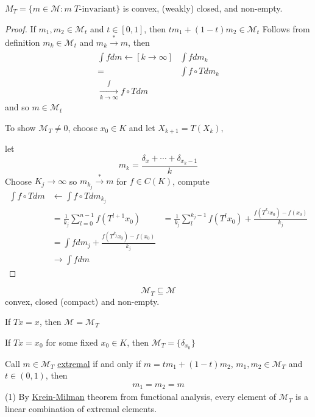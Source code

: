 \begin{theorem}
	$M_{T} = \{ m \in \mathcal{M} : m\; T \text{-invariant} \}$ is convex, (weakly) closed, and non-empty.
\end{theorem}

\begin{proof}
	If $m_1, m_2 \in \mathcal{M}_t$ and $t \in [0,1]$, then
	$t m_1 + (1-t) m_2 \in \mathcal{M}_t$
	Follows from definition
	$m_k \in \mathcal{M}_t$ and $m_k \xrightarrow[]{*} m$, then 
	\begin{align*}
		\int f dm \leftarrow[k \to \infty] &\int f dm_k \\
		= &\int f \circ T dm_k \\
		\xrightarrow[k \to \infty] \int f \circ T dm
	\end{align*} 
	and so $m \in \mathcal{M}_t$

	To show $\mathcal{M}_T \neq 0$, choose $x_0 \in K$ and let $X_{k+1} = T(X_k),$ 

	let  \[
		m_k = \frac{\delta_x + \cdots + \delta_{x_{k} - 1}}{k}
	\] 
	Choose $K_j \to \infty$ so $m_{k_j} \xrightarrow[]{*} m$ for $f \in C(K)$, compute 
	\begin{align*}
		\int f \circ T dm &\leftarrow \int f \circ T dm_{k_j} \\
						  &= \frac{1}{k_j} \sum_{l = 0}^{n-1} f(T^{l+1} x_0 )
						  &= \frac{1}{k_j} \sum_{l}^{k_j - 1} f (T^{l} x_0) + \frac{f (T^{k_j} x_0 ) - f(x_0)}{k_j} \\
						  &= \int f dm_j + \frac{f (T^{k_j} x_0 ) - f(x_0)}{k_j} \\
						  &\rightarrow \int f dm
	\end{align*}
\end{proof}


\[
	\mathcal{M}_T \subseteq \mathcal{M}
\] convex, closed (compact) and non-empty.

\begin{exercise}
	If $T x = x$, then $\mathcal{M} = \mathcal{M}_T$
\end{exercise}

\begin{exercise}
	If $T x = x_0$ for some fixed $x_0 \in K$, then $\mathcal{M}_T = \{ \delta_{x_0} \}$
\end{exercise}


\begin{definition}
	Call $m \in \mathcal{M}_T$ \underline{extremal} if and only if 
	$m = tm_1 + (1-t) m_2$, $m_1, m_2 \in \mathcal{M}_T$ and $t \in (0,1)$, then
	\begin{align}
		m_1 = m_2 = m
	\end{align} 
	(1) By \underline{Krein-Milman} theorem from functional analysis, every element of $\mathcal{M}_T$ is a linear combination of extremal elements.
\end{definition}


